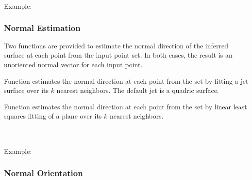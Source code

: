 Example:



\subsubsection{Normal Estimation}

Two functions are provided to estimate the normal direction of the inferred surface at each point from the input point set. In both cases, the result is an unoriented normal vector for each input point.

Function  estimates the normal direction at each point from the set by fitting a jet surface over its $k$ nearest neighbors. The default jet is a quadric surface.

Function  estimates the normal direction at each point from the set by linear least squares fitting of a plane over its $k$ nearest neighbors.

  \\
  \\


Example:



\subsubsection{Normal Orientation}

